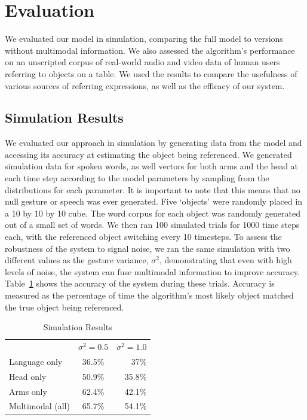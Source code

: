 \documentclass[a4paper, 11pt]{article} %
\begin{document}
\section{Evaluation}
We evaluated our model in simulation, comparing the full model to versions without multimodal information. We also assessed the algorithm's performance on an unscripted corpus of real-world audio and video data of human users referring to objects on a table. We used the results to compare the usefulness of various sources of referring expressions, as well as the efficacy of our system.
\subsection{Simulation Results}
We evaluated our approach in simulation by generating data from the model and accessing its accuracy at estimating the object being referenced. We generated simulation data for spoken words, as well vectors for both arms and the head at each time step according to the model parameters by sampling from the distributions for each parameter. It is important to note that this means that no null gesture or speech was ever generated. Five `objects' were randomly placed in a 10 by 10 by 10 cube. The word corpus for each object was randomly generated out of a small set of words. We then ran 100 simulated trials for 1000 time steps each, with the referenced object switching every 10 timesteps. To assess the robustness of the system to signal noise, we ran the same simulation with two different values as the gesture variance, $\sigma^2$, demonstrating that even with high levels of noise, the system can fuse multimodal information to improve accuracy. Table~\ref{table:sim_results} shows the accuracy of the system during these trials. Accuracy is measured as the percentage of time the algorithm's most likely object matched the true object being referenced.
\begin{table}[h]
\centering
\caption{Simulation Results\label{table:sim_results}}
\begin{tabular}{lcr}
\toprule
& $\sigma^2 = 0.5$ & $\sigma^2 = 1.0$\\
Language only &  36.5\% & 37\%\\
Head only & 50.9\% & 35.8\%\\
Arms only & 62.4\% & 42.1\%\\
Multimodal (all)&  65.7\% & 54.1\%\\
\bottomrule
\end{tabular}
\end{table}
\end{document}
